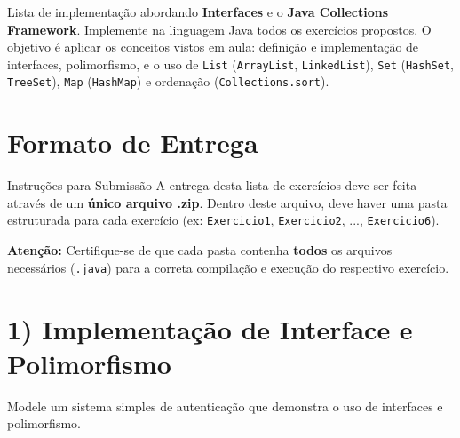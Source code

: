\documentclass[12pt]{article}
\begin{document}
Lista de implementação abordando \textbf{Interfaces} e o \textbf{Java Collections Framework}. Implemente na linguagem Java todos os exercícios propostos. O objetivo é aplicar os conceitos vistos em aula: definição e implementação de interfaces, polimorfismo, e o uso de \texttt{List} (\texttt{ArrayList}, \texttt{LinkedList}), \texttt{Set} (\texttt{HashSet}, \texttt{TreeSet}), \texttt{Map} (\texttt{HashMap}) e ordenação (\texttt{Collections.sort}).

\section*{Formato de Entrega}

\begin{block}{Instruções para Submissão}
A entrega desta lista de exercícios deve ser feita através de um \textbf{único arquivo .zip}.
Dentro deste arquivo, deve haver uma pasta estruturada para cada exercício (ex: \texttt{Exercicio1}, \texttt{Exercicio2}, ..., \texttt{Exercicio6}).

\textbf{Atenção:} Certifique-se de que cada pasta contenha \textbf{todos} os arquivos necessários (\texttt{.java}) para a correta compilação e execução do respectivo exercício.
\end{block}

\section*{1) Implementação de Interface e Polimorfismo}
Modele um sistema simples de autenticação que demonstra o uso de interfaces e polimorfismo.

\begin{center}
\end{center}
\end{document}
